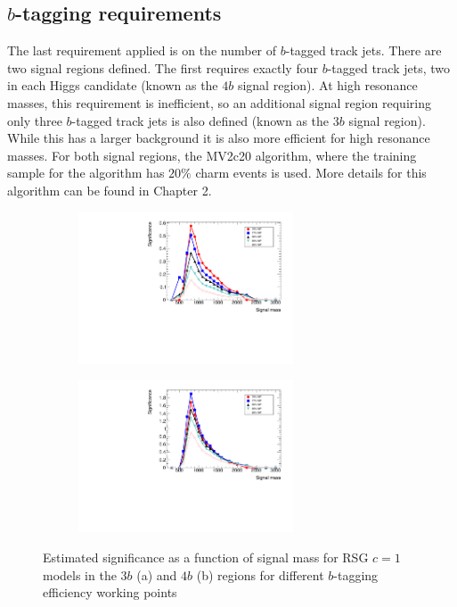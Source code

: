 \subsection{$b$-tagging requirements}

The last requirement applied is on the number of $b$-tagged track jets. There are two signal regions defined. The first requires exactly four $b$-tagged track jets, two in each Higgs candidate (known as the $4b$ signal region). At high resonance masses, this requirement is inefficient, so an additional signal region requiring only three $b$-tagged track jets is also defined (known as the $3b$ signal region). While this has a larger background it is also more efficient for high resonance masses. For both signal regions, the MV2c20 algorithm, where the training sample for the algorithm has $20\%$ charm events is used. More details for this algorithm can be found in Chapter 2.  

\begin{figure}[h!]
  \centering
  \captionsetup{justification=centering}

   \begin{subfigure}[t]{0.5\textwidth}
        \centering
        \includegraphics[width=0.7\textwidth,angle=270]{figures/sig_optimization_3b}
        \caption{}
    \end{subfigure}%
    \begin{subfigure}[t]{0.5\textwidth}
        \centering
        \includegraphics[width=0.7\textwidth,angle=270]{figures/sig_optimization_4b}
        \caption{}
    \end{subfigure}

   \caption{Estimated significance as a function of signal mass for RSG $c=1$ models in the $3b$ (a) and $4b$ (b) regions for different $b$-tagging efficiency working points}
  \label{fig:4b_sig_opt}
\end{figure}

